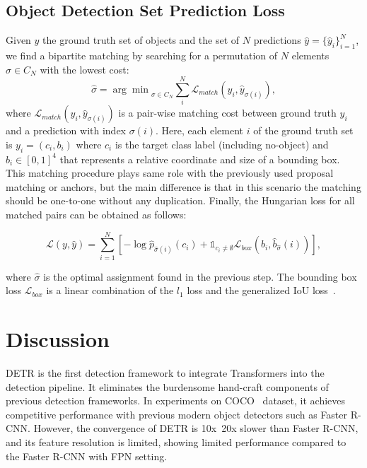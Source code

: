 \documentclass[10pt,twocolumn,letterpaper]{article}
\begin{document}
\subsection{Object Detection Set Prediction Loss}
Given $y$ the ground truth set of objects and the set of $N$ predictions $\hat{y}=\{\hat{y}_i\}^N_{i=1}$, we find a bipartite matching by searching for a permutation of $N$ elements $\sigma \in C_N$ with the lowest cost:
%
\begin{equation}\label{eq:matching}
    \hat{\sigma}={\arg\min}_{\sigma \in C_N}\sum^N_i{\mathcal{L}_{match}(y_i, \hat{y}_{\sigma(i)})},
\end{equation}
%
where $\mathcal{L}_{match}(y_i, \hat{y}_{\sigma(i)})$ is a pair-wise matching cost between ground truth $y_i$ and a prediction with index $\sigma(i)$.
Here, each element $i$ of the ground truth set is $y_i=(c_i, b_i)$ where $c_i$ is the target class label (including no-object) and $b_i\in[0,1]^4$ that represents a relative coordinate and size of a bounding box.
This matching procedure plays same role with the previously used proposal matching or anchors, but the main difference is that in this scenario the matching should be one-to-one without any duplication.
Finally, the Hungarian loss for all matched pairs can be obtained as follows:

\begin{equation}\label{eq:loss}
    \mathcal{L}(y,\hat{y})
    =\sum^N_{i=1}{[-\log \hat{p}_{\hat{\sigma}(i)}(c_i)
    + \mathds{1}_{c_i\neq \emptyset}\mathcal{L}_{box}(b_i, \hat{b}_{\hat{\sigma}}(i))]},
\end{equation}

where $\hat{\sigma}$ is the optimal assignment found in the previous step.
The bounding box loss $\mathcal{L}_{box}$ is a linear combination of the $l_1$ loss and the generalized IoU loss~\cite{giou}.





\section{Discussion}
DETR is the first detection framework to integrate Transformers into the detection pipeline. It eliminates the burdensome hand-craft components of previous detection frameworks.
In experiments on COCO~\cite{coco} dataset, it achieves competitive performance with previous modern object detectors such as Faster R-CNN.
However, the convergence of DETR is 10x~20x slower than Faster R-CNN, and its feature resolution is limited, showing limited performance compared to the Faster R-CNN with FPN setting.
\end{document}
